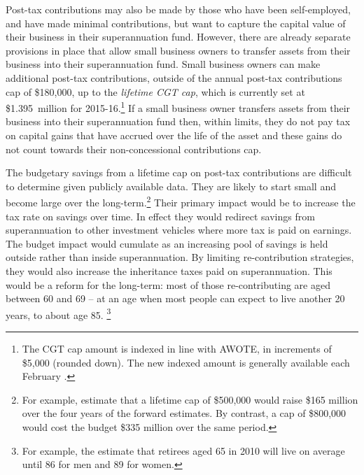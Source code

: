 Post-tax contributions may also be made by those who have been self-employed, and have made minimal contributions, but want to capture the capital value of their business in their superannuation fund. However, there are already separate provisions in place that allow small business owners to transfer assets from their business into their superannuation fund. Small business owners can make additional post-tax contributions, outside of the annual post-tax contributions cap of \$180,000, up to the \emph{lifetime CGT cap}\label{paragraph:SUPER-lifetime-CGT-cap}, which is currently set at \$1.395~million for 2015-16.\footnote{The CGT cap amount is indexed in line with AWOTE, in increments of \$5,000 (rounded down). The new indexed amount is generally available each February \textcite{ATO2015CGT-cap-amount}.}  If a small business owner transfers assets from their business into their superannuation fund then, within limits, they do not pay tax on capital gains that have accrued over the life of the asset and these gains do not count towards their non-concessional contributions cap.%
\label{fn:172}

The budgetary savings from a lifetime cap on post-tax contributions are difficult to determine given publicly available data. They are likely to start small and become large over the long-term.\footnote{For example, \textcite{PBO2015-Super-for-retirement-not-tax-minimisation} estimate that a lifetime cap of \$500,000 would raise \$165 million over the four years of the forward estimates. By contrast, a cap of \$800,000 would cost the budget \$335 million over the same period.}  Their primary impact would be to increase the tax rate on savings over time. In effect they would redirect savings from superannuation to other investment vehicles where more tax is paid on earnings. The budget impact would cumulate as an increasing pool of savings is held outside rather than inside superannuation. By limiting re-contribution strategies, they would also increase the inheritance taxes paid on superannuation. This would be a reform for the long-term: most of those re-contributing are aged between 60 and 69 – at an age when most people can expect to live another 20 years, to about age 85.%
\footnote{For example, the \textcite[][6]{ActuariesInstitute2012-Australias-Longevity-Tsunami}  estimate that retirees aged 65 in 2010 will live on average until 86 for men and 89 for women.}  


